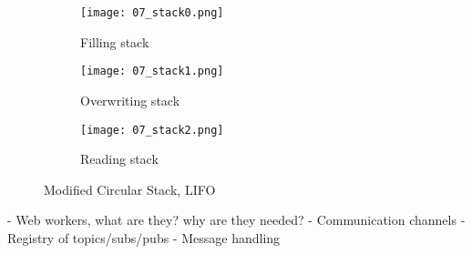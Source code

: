        \begin{figure}[htbp]
            \centering
            \begin{subfigure}[t]{0.32\textwidth}
                \texttt{[image: 07\_stack0.png]}
                \caption{Filling stack}
            \end{subfigure}
            \begin{subfigure}[t]{0.32\textwidth}
                \texttt{[image: 07\_stack1.png]}
                \caption{Overwriting stack}
            \end{subfigure}
            \begin{subfigure}[t]{0.32\textwidth}
                \texttt{[image: 07\_stack2.png]}
                \caption{Reading stack}
            \end{subfigure}
            \caption{Modified Circular Stack, \ac{LIFO}}
            \label{fig:circleStack}
        \end{figure}

    - Web workers, what are they? why are they needed?
    - Communication channels
    - Registry of topics/subs/pubs
    - Message handling

